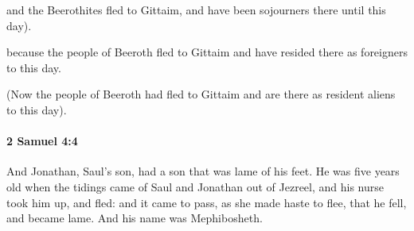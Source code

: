 			\begin{versebox}
					\item[BHS] 
					\item[ASV] and the Beerothites fled to Gittaim, and have been sojourners there until this day).
					\item[NIV] because the people of Beeroth fled to Gittaim and have resided there as foreigners to this day.
					\item[NRSV] (Now the people of Beeroth had fled to Gittaim and are there as resident aliens to this day).
			\end{versebox}

		\paragraph{2 Samuel 4:4} %
			\label{2SAMUEL-4-4}

			And Jonathan, Saul’s son, had a son that was lame of his feet. He was five years old when the tidings came of Saul and Jonathan out of Jezreel, and his nurse took him up, and fled: and it came to pass, as she made haste to flee, that he fell, and became lame. And his name was Mephibosheth.

